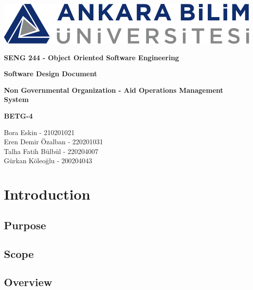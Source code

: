 \documentclass[a4paper,12pt]{report}
\begin{document}
	\begin{titlepage}
		\begin{center}
			\includegraphics{ankara_bilim.png}
		\end{center}
		\vspace{1cm}
		\begin{center}
			\LARGE
			\textbf{SENG 244 - Object Oriented Software Engineering}
		\end{center}
		\vspace{1cm}
		\begin{center}
			\Large
			\textbf{Software Design Document}
		\end{center}
		\vspace{1cm}
		\begin{center}
			\Large
			\textbf{Non Governmental Organization - Aid Operations Management System}
		\end{center}
		\vspace{2cm}
		\begin{center}
			\large
			\textbf{BETG-4}
		\end{center}
		\vspace{1cm}
		\begin{center}
			\large
			Bora Eskin - 210201021\\
			Eren Demir Özalban - 220201031\\
			Talha Fatih Bülbül - 220204007\\
			Gürkan Köleoğlu - 200204043
		\end{center}
	\end{titlepage}
	
	\tableofcontents
	
	\chapter{Introduction}
		\section{Purpose}
		\section{Scope}
		\section{Overview}
\end{document}
